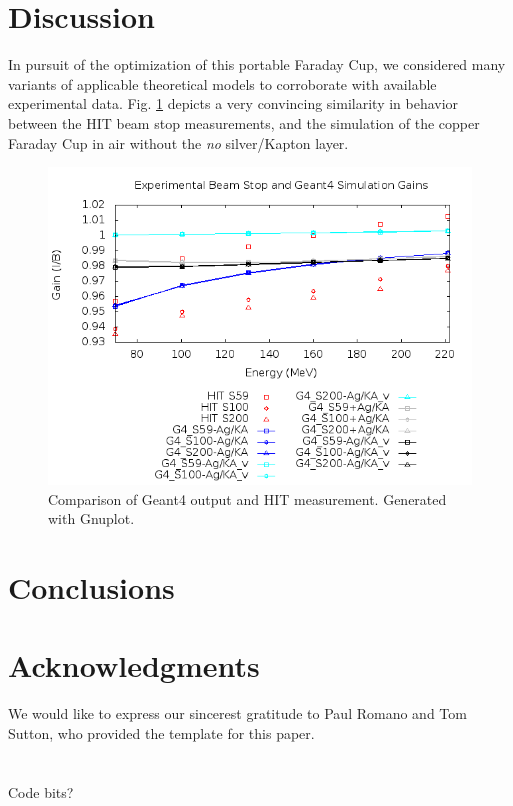 \documentclass{mc2015}
\begin{document}
\section{Discussion}

In pursuit of the optimization of this portable Faraday Cup, we considered many variants of applicable theoretical models to corroborate with available experimental data.  Fig. \ref{fig:comp_results} depicts a very convincing similarity in behavior between the HIT beam stop measurements, and the simulation of the copper Faraday Cup in air without the \emph{no} silver/Kapton layer.

\begin{figure}[H]
  \centering
  \includegraphics[width=5in]{fig_results.png}
  \caption{Comparison of Geant4 output and HIT measurement.  Generated with Gnuplot.}
  \label{fig:comp_results}
\end{figure}


\section{Conclusions}


\section{Acknowledgments}

We would like to express our sincerest gratitude to Paul Romano and Tom Sutton, who provided the template for this paper.

\setlength{\baselineskip}{12pt}




\appendix
\section{}

Code bits?

\pageref{lastpage}
\end{document}
